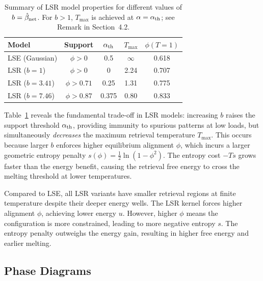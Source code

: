 \documentclass{article}
\theoremstyle{plain}
\theoremstyle{definition}
\theoremstyle{remark}
\begin{document}
\begin{table}[t]
\caption{Summary of LSR model properties for different values of $b = \hat{\beta}_{\rm net}$. For $b > 1$, $T_{\max}$ is achieved at $\alpha = \alpha_{\rm th}$; see Remark in Section~4.2.}
\label{tab:lsr_b_values}
\vskip 0.1in
\begin{center}
\begin{small}
\begin{tabular}{lcccc}
\toprule
Model & Support & $\alpha_{\rm th}$ & $T_{\max}$ & $\phi(T\!=\!1)$ \\
\midrule
LSE (Gaussian) & $\phi > 0$ & 0.5 & $\infty$ & 0.618 \\
LSR ($b = 1$) & $\phi > 0$ & 0 & 2.24 & 0.707 \\
LSR ($b = 3.41$) & $\phi > 0.71$ & 0.25 & 1.31 & 0.775 \\
LSR ($b = 7.46$) & $\phi > 0.87$ & 0.375 & 0.80 & 0.833 \\
\bottomrule
\end{tabular}
\end{small}
\end{center}
\end{table}

Table~\ref{tab:lsr_b_values} reveals the fundamental trade-off in LSR models: increasing $b$ raises the support threshold $\alpha_{\rm th}$, providing immunity to spurious patterns at low loads, but simultaneously \emph{decreases} the maximum retrieval temperature $T_{\max}$. This occurs because larger $b$ enforces higher equilibrium alignment $\phi$, which incurs a larger geometric entropy penalty $s(\phi) = \frac{1}{2}\ln(1-\phi^2)$. The entropy cost $-Ts$ grows faster than the energy benefit, causing the retrieval free energy to cross the melting threshold at lower temperatures.

Compared to LSE, all LSR variants have smaller retrieval regions at finite temperature despite their deeper energy wells. The LSR kernel forces higher alignment $\phi$, achieving lower energy $u$. However, higher $\phi$ means the configuration is more constrained, leading to more negative entropy $s$. The entropy penalty outweighs the energy gain, resulting in higher free energy and earlier melting.

\subsection{Phase Diagrams}
\end{document}
